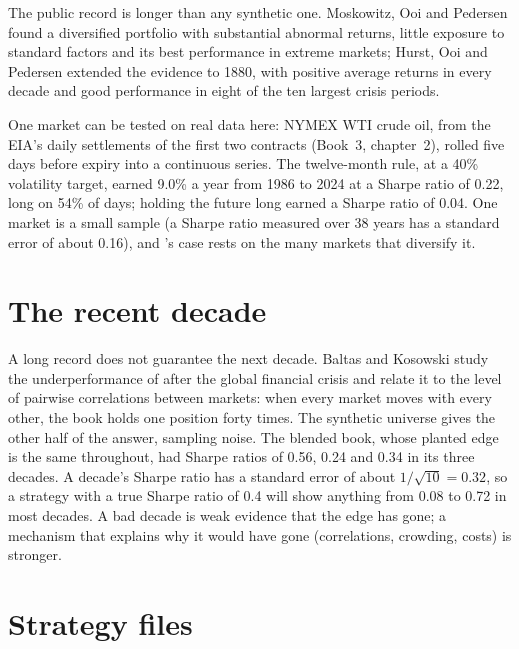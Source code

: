 The public record is longer than any synthetic one. Moskowitz, Ooi and Pedersen found a diversified  portfolio with substantial
abnormal returns, little exposure to standard factors and its best performance in extreme markets; Hurst, Ooi and Pedersen extended the evidence to 1880,
with positive average returns in every decade and good performance in eight of the ten largest crisis periods.

One market can be tested on real data here: NYMEX WTI crude oil, from the EIA's daily settlements of the first two contracts (Book~3, chapter~2),
rolled five days before expiry into a continuous series. The twelve-month rule, at a 40\% volatility target, earned 9.0\% a year from 1986 to 2024 at a
Sharpe ratio of 0.22, long on 54\% of days; holding the future long earned a Sharpe ratio of 0.04. One market is a small sample (a Sharpe ratio measured
over 38 years has a standard error of about 0.16), and 's case rests on the many markets that diversify it.

\section{The recent decade}

A long record does not guarantee the next decade. Baltas and Kosowski study the underperformance of  after the global financial
crisis and relate it to the level of pairwise correlations between markets: when every market moves with every other, the book holds one position forty
times. The synthetic universe gives the other half of the answer, sampling noise. The blended book, whose planted edge is the same throughout, had
Sharpe ratios of 0.56, 0.24 and 0.34 in its three decades. A decade's Sharpe ratio has a standard error of about $1/\sqrt{10} = 0.32$, so a strategy
with a true Sharpe ratio of 0.4 will show anything from 0.08 to 0.72 in most decades. A bad decade is weak evidence that the edge has gone; a
mechanism that explains why it would have gone (correlations, crowding, costs) is stronger.

\section{Strategy files}

